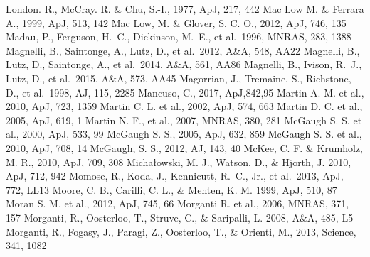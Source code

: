 \begin{thebibliography}{99}
\begin{multicols}{2}
{
	London. R., McCray. R. \& Chu, S.-I., 1977, ApJ, 217, 442
	Mac Low M. \& Ferrara A., 1999, ApJ, 513, 142
	Mac Low, M. \& Glover, S. C. O., 2012, ApJ, 746, 135
	Madau, P., Ferguson, H.~C., Dickinson, M.~E., et al.\ 1996, MNRAS, 283, 1388 
	Magnelli, B., Saintonge, A., Lutz, D., et al.\ 2012, A\&A, 548, AA22 
	Magnelli, B., Lutz, D., Saintonge, A., et al.\ 2014, A\&A, 561, AA86 
	Magnelli, B., Ivison, R.~J., Lutz, D., et al.\ 2015, A\&A, 573, AA45 
	Magorrian, J., Tremaine, S., Richstone, D., et al.\ 1998, AJ, 115, 2285 
    Mancuso, C., 2017, ApJ,842,95
	Martin A. M. et al., 2010, ApJ, 723, 1359
	Martin C. L. et al., 2002, ApJ, 574, 663
	Martin D. C. et al., 2005, ApJ, 619, 1
	Martin N. F., et al., 2007, MNRAS, 380, 281
	McGaugh S. S. et al., 2000, ApJ, 533, 99
	McGaugh S. S., 2005, ApJ, 632, 859
	McGaugh S. S. et al., 2010, ApJ, 708, 14
	McGaugh, S. S., 2012, AJ, 143, 40
	McKee, C. F. \& Krumholz, M. R., 2010, ApJ, 709, 308
    	Micha{\l}owski, M. J., Watson, D., \& Hjorth, J. 2010, ApJ, 712, 942
	Momose, R., Koda, J., Kennicutt, R.~C., Jr., et al.\ 2013, ApJ, 772, LL13 
    	Moore, C. B., Carilli, C. L., \& Menten, K. M. 1999, ApJ, 510, 87
	Moran S. M. et al., 2012, ApJ, 745, 66
	Morganti R. et al., 2006, MNRAS, 371, 157
    	Morganti, R., Oosterloo, T., Struve, C., \& Saripalli, L. 2008, A\&A, 485, L5
    	Morganti, R., Fogasy, J., Paragi, Z., Oosterloo, T., \&  Orienti, M., 2013, Science, 341, 1082
}
\end{multicols}
\end{thebibliography}
